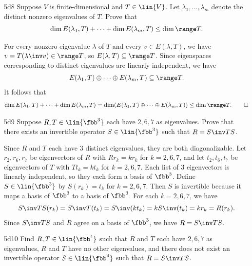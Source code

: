 \begin{exercise}{5d8}
    Suppose $V$ is finite-dimensional and $T \in \lin{V}$.
    Let $\lambda_1, \ldots, \lambda_m$ denote the distinct nonzero eigenvalues of $T$.
    Prove that
    \[
        \dim E(\lambda_1, T) + \cdots + \dim E(\lambda_m, T) \leq \dim \range T.
    \]
\end{exercise}

\begin{sol}
    For every nonzero eigenvalue $\lambda$ of $T$ and every $v \in E(\lambda, T)$, we have $v = T(\lambda\inv v) \in \range T$, so $E(\lambda, T) \subseteq \range T$.
    Since eigenspaces corresponding to distinct eigenvalues are linearly independent, we have
    \[
        E(\lambda_1, T) \oplus \cdots \oplus E(\lambda_m, T) \subseteq \range T.
    \]
    It follows that
    \[
        \dim E(\lambda_1, T) + \cdots + \dim E(\lambda_m, T) = \dim(E(\lambda_1, T) \oplus \cdots \oplus E(\lambda_m, T)) \leq \dim \range T. \qedhere
    \]
\end{sol}

\begin{exercise}{5d9}
    Suppose $R, T \in \lin{\fbb^3}$ each have $2, 6, 7$ as eigenvalues.
    Prove that there exists an invertible operator $S \in \lin{\fbb^3}$ such that $R = S\inv T S$.
\end{exercise}

\begin{sol}
    Since $R$ and $T$ each have 3 distinct eigenvalues, they are both diagonalizable.
    Let $r_2, r_6, r_7$ be eigenvectors of $R$ with $Rr_k = kr_k$ for $k = 2, 6, 7$, and let $t_2, t_6, t_7$ be eigenvectors of $T$ with $Tt_k = kt_k$ for $k = 2, 6, 7$.
    Each list of 3 eigenvectors is linearly independent, so they each form a basis of $\fbb^3$.
    Define $S \in \lin{\fbb^3}$ by $S(r_k) = t_k$ for $k = 2, 6, 7$.
    Then $S$ is invertible because it maps a basis of $\fbb^3$ to a basis of $\fbb^3$.
    For each $k = 2, 6, 7$, we have
    \[
        S\inv T S(r_k) = S\inv T(t_k) = S\inv(kt_k) = kS\inv(t_k) = kr_k = R(r_k).
    \]
    Since $S\inv T S$ and $R$ agree on a basis of $\fbb^3$, we have $R = S\inv T S$.
\end{sol}

\begin{exercise}{5d10}
    Find $R, T \in \lin{\fbb^4}$ such that $R$ and $T$ each have $2, 6, 7$ as eigenvalues, $R$ and $T$ have no other eigenvalues, and there does not exist an invertible operator $S \in \lin{\fbb^4}$ such that $R = S\inv T S$.
\end{exercise}

